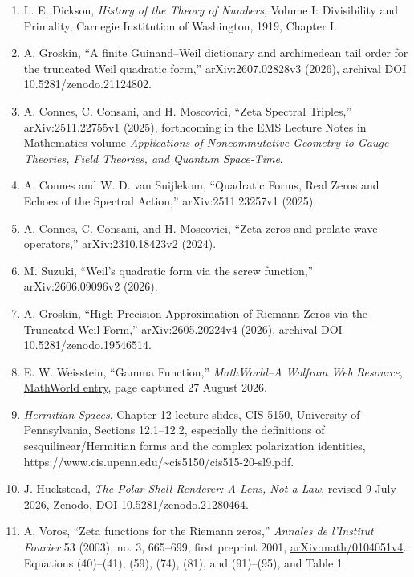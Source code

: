 \documentclass[
  11pt,
]{book}
\begin{document}
\begin{enumerate}
  introduction and commentary by T. L. Heath, 2nd ed., Dover, 1956, Book
  VII, Definition 22, and Book IX, Proposition 36.
\item
  L. E. Dickson, \emph{History of the Theory of Numbers}, Volume I:
  Divisibility and Primality, Carnegie Institution of Washington, 1919,
  Chapter I.
\item
  A. Groskin, ``A finite Guinand--Weil dictionary and archimedean tail
  order for the truncated Weil quadratic form,'' arXiv:2607.02828v3
  (2026), archival DOI 10.5281/zenodo.21124802.
\item
  A. Connes, C. Consani, and H. Moscovici, ``Zeta Spectral Triples,''
  arXiv:2511.22755v1 (2025), forthcoming in the EMS Lecture Notes in
  Mathematics volume \emph{Applications of Noncommutative Geometry to
  Gauge Theories, Field Theories, and Quantum Space-Time}.
\item
  A. Connes and W. D. van Suijlekom, ``Quadratic Forms, Real Zeros and
  Echoes of the Spectral Action,'' arXiv:2511.23257v1 (2025).
\item
  A. Connes, C. Consani, and H. Moscovici, ``Zeta zeros and prolate wave
  operators,'' arXiv:2310.18423v2 (2024).
\item
  M. Suzuki, ``Weil's quadratic form via the screw function,''
  arXiv:2606.09096v2 (2026).
\item
  A. Groskin, ``High-Precision Approximation of Riemann Zeros via the
  Truncated Weil Form,'' arXiv:2605.20224v4 (2026), archival DOI
  10.5281/zenodo.19546514.
\item
  E. W. Weisstein, ``Gamma Function,'' \emph{MathWorld--A Wolfram Web
  Resource},
  \href{https://mathworld.wolfram.com/GammaFunction.html}{MathWorld
  entry}, page captured 27 August 2026.
\item
  \emph{Hermitian Spaces}, Chapter 12 lecture slides, CIS 5150,
  University of Pennsylvania, Sections 12.1--12.2, especially the
  definitions of sesquilinear/Hermitian forms and the complex
  polarization identities,
  https://www.cis.upenn.edu/\textasciitilde cis5150/cis515-20-sl9.pdf.
\item
  J. Huckstead, \emph{The Polar Shell Renderer: A Lens, Not a Law},
  revised 9 July 2026, Zenodo, DOI 10.5281/zenodo.21280464.
\item
  A. Voros, ``Zeta functions for the Riemann zeros,'' \emph{Annales de
  l'Institut Fourier} 53 (2003), no. 3, 665--699; first preprint 2001,
  \href{https://arxiv.org/abs/math/0104051v4}{arXiv:math/0104051v4}.
  Equations (40)--(41), (59), (74), (81), and (91)--(95), and Table 1

\end{enumerate}
\end{document}
